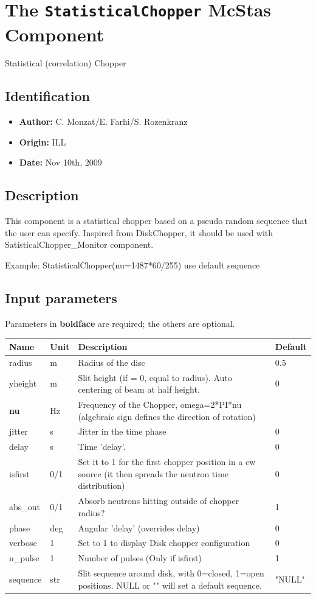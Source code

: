 \section{The \texttt{StatisticalChopper} McStas Component}
Statistical (correlation) Chopper

\subsection*{Identification}
\begin{itemize}
  \item \textbf{Author:} C. Monzat/E. Farhi/S. Rozenkranz
  \item \textbf{Origin:} ILL
  \item \textbf{Date:} Nov 10th, 2009
\end{itemize}

\subsection*{Description}
This component is a statistical chopper based on a pseudo random sequence that the user can specify. Inspired from DiskChopper, it should be used with SatisticalChopper\_Monitor component.

Example: StatisticalChopper(nu=1487*60/255) use default sequence

\subsection*{Input parameters}
Parameters in \textbf{boldface} are required; the others are optional.

\begin{longtable}{p{}p{}p{}p{}}
\toprule
\textbf{Name} & \textbf{Unit} & \textbf{Description} & \textbf{Default} \\
\midrule
\endhead
radius & m & Radius of the disc & 0.5 \\
yheight & m & Slit height (if = 0, equal to radius). Auto centering of beam at half height. & 0 \\
\textbf{nu} & Hz & Frequency of the Chopper, omega=2*PI*nu (algebraic sign defines the direction of rotation) &  \\
jitter & s & Jitter in the time phase & 0 \\
delay & s & Time 'delay'. & 0 \\
isfirst & 0/1 & Set it to 1 for the first chopper position in a cw source (it then spreads the neutron time distribution) & 0 \\
abs\_out & 0/1 & Absorb neutrons hitting outside of chopper radius? & 1 \\
phase & deg & Angular 'delay' (overrides delay) & 0 \\
verbose & 1 & Set to 1 to display Disk chopper configuration & 0 \\
n\_pulse & 1 & Number of pulses (Only if isfirst) & 1 \\
sequence & str & Slit sequence around disk, with 0=closed, 1=open positions. NULL or "" will set a default sequence. & "NULL" \\
\bottomrule
\end{longtable}

